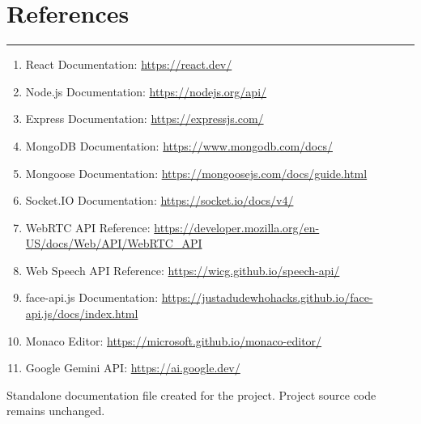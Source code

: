 ﻿\documentclass[12pt,a4paper]{article}
\newcommand{\sectionline}{\vspace{0.4em}\hrule\vspace{0.8em}}
\begin{document}
\section{References}
\sectionline
\begin{enumerate}
  \item React Documentation: \url{https://react.dev/}
  \item Node.js Documentation: \url{https://nodejs.org/api/}
  \item Express Documentation: \url{https://expressjs.com/}
  \item MongoDB Documentation: \url{https://www.mongodb.com/docs/}
  \item Mongoose Documentation: \url{https://mongoosejs.com/docs/guide.html}
  \item Socket.IO Documentation: \url{https://socket.io/docs/v4/}
  \item WebRTC API Reference: \url{https://developer.mozilla.org/en-US/docs/Web/API/WebRTC_API}
  \item Web Speech API Reference: \url{https://wicg.github.io/speech-api/}
  \item face-api.js Documentation: \url{https://justadudewhohacks.github.io/face-api.js/docs/index.html}
  \item Monaco Editor: \url{https://microsoft.github.io/monaco-editor/}
  \item Google Gemini API: \url{https://ai.google.dev/}
\end{enumerate}

\vfill
\begin{center}
  {\small\color{TextMuted}Standalone documentation file created for the project. Project source code remains unchanged.}
\end{center}
\end{document}
